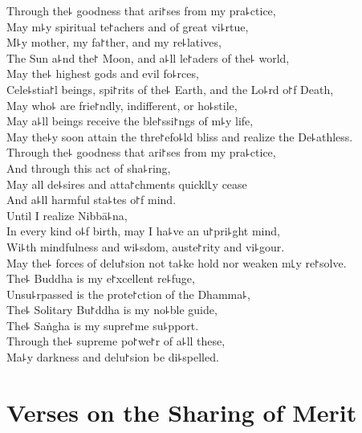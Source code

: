 Through the꜕ goodness that ari꜓ses from my pra꜕ctice,\\
May m꜕y spiritual te꜓achers and  of great vi꜕rtue,\\
M꜕y mother, my fa꜓ther, and my re꜕latives,\\
The Sun a꜕nd the꜓ Moon, and a꜕ll  le꜓aders of the꜕ world,\\
May the꜕ highest gods and evil fo꜕rces,\\
Cele꜕stia꜓l beings,  spi꜓rits of the꜕ Earth, and the Lo꜕rd o꜓f Death,\\
May  who꜕ are frie꜓ndly, indifferent, or ho꜕stile,\\
May a꜕ll beings receive the ble꜓ssi꜓ngs of m꜕y life,\\
May the꜕y soon attain the thre꜓efo꜕ld bliss and realize the De꜕athless.\\
Through the꜕ goodness that ari꜓ses from my pra꜕ctice,\\
And through this act of sha꜕ring,\\
May all de꜕sires and atta꜓chments quickl꜖y cease\\
And a꜕ll harmful sta꜕tes o꜓f mind.\\
Until I realize Nibbā꜕na,\\
In every kind o꜕f birth, may I ha꜕ve an u꜓pri꜕ght mind,\\
Wi꜕th mindfulness and wi꜕sdom, auste꜓rity and vi꜕gour.\\
May the꜕ forces of delu꜓sion not ta꜕ke hold nor weaken m꜖y re꜓solve.\\
The꜕ Buddha is my e꜓xcellent re꜕fuge,\\
Unsu꜕rpassed is the prote꜓ction of the Dhamma꜕,\\
The꜕ Solitary Bu꜓ddha is my no꜕ble guide,\\
The꜕ Saṅgha is my supre꜓me su꜕pport.\\
Through the꜕ supreme po꜓we꜓r of a꜕ll these,\\
Ma꜕y darkness and delu꜓sion be di꜕spelled.

\chapter[Sharing of Merit]{Verses on the Sharing of Merit}%


\begin{leader}
\end{leader}

